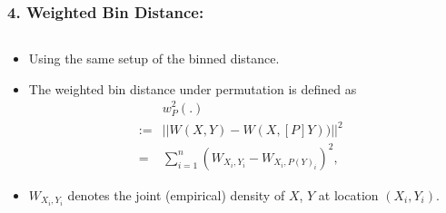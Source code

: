 \documentclass{beamer}
\begin{document}
\begin{frame}
\frametitle{4. Weighted Bin Distance:}
	\begin{columns}
		\begin{column}{0.55\textwidth}
		\begin{itemize}
\item Using the same setup of the binned distance.
\item The weighted bin distance under permutation is defined as 
\begin{eqnarray*}
& & w_P^2(.)\\ &:=&||W(X,Y) - W(X,[P]Y))||^2 \\ &=& \sum_{i=1}^n (W_{X_{i},Y_i} - W_{X_i,P(Y)_i})^2 , 
\end{eqnarray*}
\item $W_{X_i,Y_i}$ denotes the joint (empirical) density of $X$, $Y$ at location $(X_i, Y_i)$. 
\end{itemize}	
			
		\end{column}
		
		\begin{column}{0.5\textwidth}
			 \begin{center}  \end{center}
		\end{column}
	\end{columns}  
\end{frame}
\end{document}
